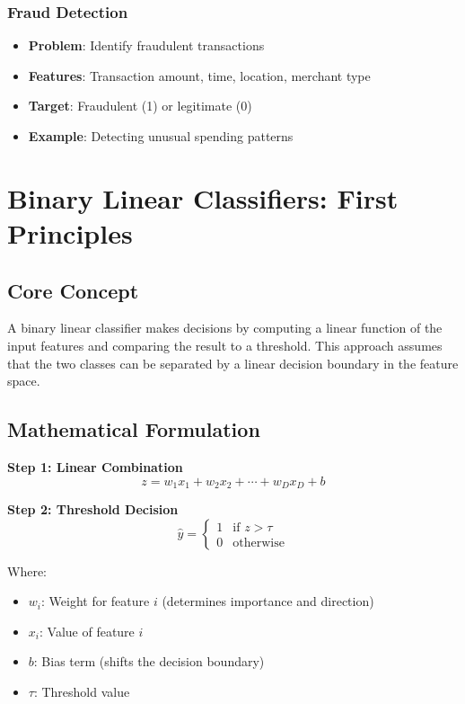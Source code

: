 \subsubsection{Fraud Detection}
\begin{itemize}
    \item \textbf{Problem}: Identify fraudulent transactions
    \item \textbf{Features}: Transaction amount, time, location, merchant type
    \item \textbf{Target}: Fraudulent (1) or legitimate (0)
    \item \textbf{Example}: Detecting unusual spending patterns
\end{itemize}

\section{Binary Linear Classifiers: First Principles}

\subsection{Core Concept}

A binary linear classifier makes decisions by computing a linear function of the input features and comparing the result to a threshold. This approach assumes that the two classes can be separated by a linear decision boundary in the feature space.

\subsection{Mathematical Formulation}

\textbf{Step 1: Linear Combination}
\begin{equation}
z = w_1x_1 + w_2x_2 + \cdots + w_D x_D + b
\end{equation}

\textbf{Step 2: Threshold Decision}
\begin{equation}
\hat{y} = \begin{cases}
1 & \text{if } z > \tau \\
0 & \text{otherwise}
\end{cases}
\end{equation}

Where:
\begin{itemize}
    \item $w_i$: Weight for feature $i$ (determines importance and direction)
    \item $x_i$: Value of feature $i$
    \item $b$: Bias term (shifts the decision boundary)
    \item $\tau$: Threshold value
\end{itemize}

